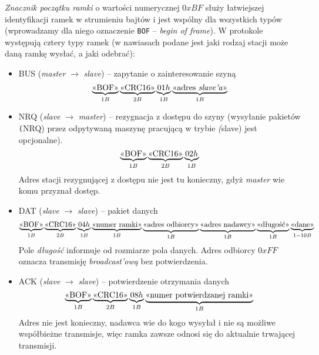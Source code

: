 \documentclass[a4paper,12pt]{article}
\begin{document}
\emph{Znacznik początku ramki} o wartości numerycznej $0xBF$ służy łatwiejszej
identyfikacji ramek w strumieniu bajtów i jest wspólny dla wszystkich typów
(wprowadzamy dla niego oznaczenie \texttt{BOF} -- \emph{begin of frame}).
W protokole występują cztery typy ramek (w nawiasach podane jest jaki rodzaj
stacji może daną ramkę wysłać, a jaki odebrać):
\begin{itemize}
  \item BUS (\emph{master} $\rightarrow$ \emph{slave}) -- zapytanie
        o zainteresowanie szyną
    \begin{displaymath}
      \underbrace{\hbox{<<BOF>>}}_{1B}
      \underbrace{\hbox{<<CRC16>>}}_{2B}
      \underbrace{01h}_{1B}
      \underbrace{\hbox{<<adres \emph{slave'a}>>}}_{1B}
    \end{displaymath}
  \item NRQ (\emph{slave} $\rightarrow$ \emph{master}) -- rezygnacja z dostępu do
        szyny (wysyłanie pakietów \texttt(NRQ) przez odpytywaną maszynę pracującą
		w trybie \emph(slave) jest opcjonalne).
    \begin{displaymath}
      \underbrace{\hbox{<<BOF>>}}_{1B}
      \underbrace{\hbox{<<CRC16>>}}_{2B}
      \underbrace{02h}_{1B}
    \end{displaymath}
    Adres stacji rezygnującej z dostępu nie jest tu konieczny, gdyż \emph{master}
	wie komu przyznał dostęp.
  \item DAT (\emph{slave} $\rightarrow$ \emph{slave}) -- pakiet danych
    \begin{displaymath}
      \underbrace{\hbox{<<BOF>>}}_{1B}
      \underbrace{\hbox{<<CRC16>>}}_{2B}
      \underbrace{04h}_{1B}
      \underbrace{\hbox{<<numer ramki>>}}_{1B}
      \underbrace{\hbox{<<adres odbiorcy>>}}_{1B}
      \underbrace{\hbox{<<adres nadawcy>>}}_{1B}
      \underbrace{\hbox{<<długość>>}}_{1B}
      \underbrace{\hbox{<<dane>>}}_{1-10B}
    \end{displaymath}
    Pole \emph{długość} informuje od rozmiarze pola danych. Adres odbiorcy
    $0xFF$ oznacza transmisję \emph{broadcast'ową} bez potwierdzenia.
  \item ACK (\emph{slave} $\rightarrow$ \emph{slave}) -- potwierdzenie
        otrzymania danych
    \begin{displaymath}
      \underbrace{\hbox{<<BOF>>}}_{1B}
      \underbrace{\hbox{<<CRC16>>}}_{2B}
      \underbrace{08h}_{1B}
      \underbrace{\hbox{<<numer potwierdzanej ramki>>}}_{1B}
    \end{displaymath}
    Adres nie jest konieczny, nadawca wie do kogo wysyłał i nie są możliwe
    współbieżne transmisje, więc ramka zawsze odnosi się do aktualnie
    trwającej transmisji.
\end{itemize}
\end{document}
